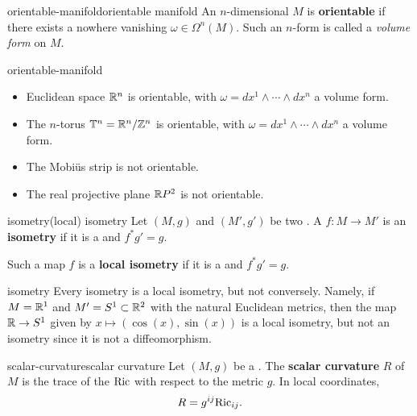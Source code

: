\begin{topic}{orientable-manifold}{orientable manifold}
    An $n$-dimensional  $M$ is \textbf{orientable} if there exists a nowhere vanishing  $\omega \in \Omega^n(M)$. Such an $n$-form is called a \textit{volume form} on $M$.
\end{topic}

\begin{example}{orientable-manifold}
    \begin{itemize}
        \item Euclidean space $\mathbb{R}^n$ is orientable, with $\omega = dx^1 \wedge \cdots \wedge dx^n$ a volume form.
        \item The $n$-torus $\mathbb{T}^n = \mathbb{R}^n / \mathbb{Z}^n$ is orientable, with $\omega = dx^1 \wedge \cdots \wedge dx^n$ a volume form.
        \item The Mobiüs strip is not orientable.
        \item The real projective plane $\mathbb{R} P^2$ is not orientable.
    \end{itemize}
\end{example}

\begin{topic}{isometry}{(local) isometry}
    Let $(M, g)$ and $(M', g')$ be two . A  $f : M \to M'$ is an \textbf{isometry} if it is a  and $f^*g' = g$.
    
    Such a map $f$ is a \textbf{local isometry} if it is a  and $f^*g' = g$.
\end{topic}

\begin{example}{isometry}
    Every isometry is a local isometry, but not conversely. Namely, if $M = \mathbb{R}^1$ and $M' = S^1 \subset \mathbb{R}^2$ with the natural Euclidean metrics, then the map $\mathbb{R} \to S^1$ given by $x \mapsto (\cos(x), \sin(x))$ is a local isometry, but not an isometry since it is not a diffeomorphism.
\end{example}

\begin{topic}{scalar-curvature}{scalar curvature}
    Let $(M, g)$ be a . The \textbf{scalar curvature} $R$ of $M$ is the trace of the  $\textup{Ric}$ with respect to the metric $g$. In local coordinates,
    \[ R = g^{ij} \textup{Ric}_{ij} . \]
\end{topic}

